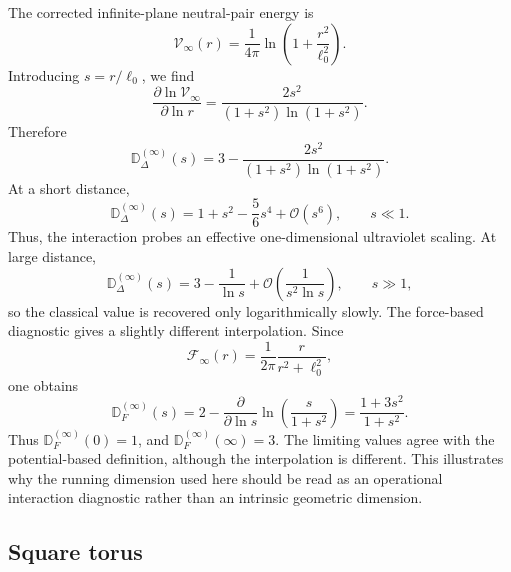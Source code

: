 \documentclass[nopacs,amsmath,amsfonts,amssymb,aps,superscriptaddress]{revtex4}
\begin{document}
The corrected infinite-plane neutral-pair energy is
\begin{equation}
  \mathcal V_\infty(r)=\frac{1}{4\pi}\ln\left(1+\frac{r^2}{\ell_0^2}\right).
\end{equation}
Introducing $s=r/\ell_0$, we find
\begin{equation}
  \frac{\partial\ln \mathcal V_\infty}{\partial\ln r}=\frac{2s^2}{(1+s^2)\ln(1+s^2)}.
\end{equation}
Therefore
\begin{equation}\label{Dinf}
  \mathbb D_\Delta^{(\infty)}(s)=3-\frac{2s^2}{(1+s^2)\ln(1+s^2)}.
\end{equation}
At a short distance,
\begin{equation}
  \mathbb D_\Delta^{(\infty)}(s)=1+s^2-\frac{5}{6}s^4+\mathcal{O}(s^6),\qquad s\ll 1.
\end{equation}
Thus, the interaction probes an effective one-dimensional ultraviolet scaling. At large distance,
\begin{equation}
  \mathbb D_\Delta^{(\infty)}(s)=3-\frac{1}{\ln s}+\mathcal{O}\!\left(\frac{1}{s^2\ln s}\right),\qquad s\gg 1,
\end{equation}
so the classical value is recovered only logarithmically slowly. The force-based diagnostic gives a slightly different interpolation. Since
\begin{equation}
\mathcal F_\infty(r)=\frac{1}{2\pi}\frac{r}{r^2+\ell_0^2},
\end{equation}
one obtains
\begin{equation}
\mathbb D_F^{(\infty)}(s)=2-\frac{\partial}{\partial\ln s}\ln\left(\frac{s}{1+s^2}\right)
=\frac{1+3s^2}{1+s^2}.
\end{equation}
Thus $\mathbb D_F^{(\infty)}(0)=1$, and $\mathbb D_F^{(\infty)}(\infty)=3$. The limiting values agree with the potential-based definition, although the interpolation is different. This illustrates why the running dimension used here should be read as an operational interaction diagnostic rather than an intrinsic geometric dimension.

\subsection{Square torus}
\label{subsec:running_dimension_torus}
\end{document}
